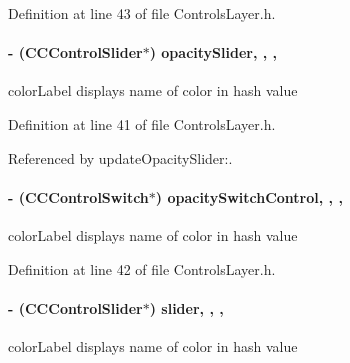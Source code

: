 Definition at line 43 of file Controls\-Layer.\-h.

\hypertarget{interface_controls_layer_aff48213936f8ff3b2aa2f44d5125fc6f}{
\paragraph[{opacity\-Slider}]{\setlength{\rightskip}{0pt plus 5cm}-\/ (C\-C\-Control\-Slider$\ast$) opacity\-Slider\hspace{0.3cm}{\ttfamily [read]}, {\ttfamily [write]}, {\ttfamily [nonatomic]}, {\ttfamily [strong]}}}\label{d1/d1a/interface_controls_layer_aff48213936f8ff3b2aa2f44d5125fc6f}
color\-Label displays name of color in hash value 

Definition at line 41 of file Controls\-Layer.\-h.



Referenced by update\-Opacity\-Slider\-:.

\hypertarget{interface_controls_layer_ad2bbac273b79a99c46e66c61ea66c88b}{
\paragraph[{opacity\-Switch\-Control}]{\setlength{\rightskip}{0pt plus 5cm}-\/ (C\-C\-Control\-Switch$\ast$) opacity\-Switch\-Control\hspace{0.3cm}{\ttfamily [read]}, {\ttfamily [write]}, {\ttfamily [nonatomic]}, {\ttfamily [strong]}}}\label{d1/d1a/interface_controls_layer_ad2bbac273b79a99c46e66c61ea66c88b}
color\-Label displays name of color in hash value 

Definition at line 42 of file Controls\-Layer.\-h.

\hypertarget{interface_controls_layer_a599701380c37caf4e656efaa860469a3}{
\paragraph[{slider}]{\setlength{\rightskip}{0pt plus 5cm}-\/ (C\-C\-Control\-Slider$\ast$) slider\hspace{0.3cm}{\ttfamily [read]}, {\ttfamily [write]}, {\ttfamily [nonatomic]}, {\ttfamily [strong]}}}\label{d1/d1a/interface_controls_layer_a599701380c37caf4e656efaa860469a3}
color\-Label displays name of color in hash value 

